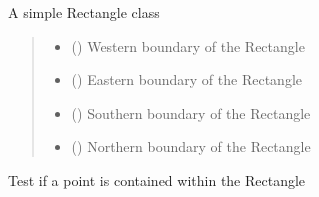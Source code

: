 \documentclass[letterpaper,10pt,english]{sphinxmanual}
\begin{document}
\begin{fulllineitems}
\label{\detokenize{users_guide:GeoSpatialTools.quadtree.Rectangle}}
\pysigstartsignatures
{}
\pysigstopsignatures
\sphinxAtStartPar
A simple Rectangle class
\begin{quote}\begin{description}
\begin{itemize}
\item {} 
\sphinxAtStartPar
{} () \textendash{} Western boundary of the Rectangle

\item {} 
\sphinxAtStartPar
{} () \textendash{} Eastern boundary of the Rectangle

\item {} 
\sphinxAtStartPar
{} () \textendash{} Southern boundary of the Rectangle

\item {} 
\sphinxAtStartPar
{} () \textendash{} Northern boundary of the Rectangle

\end{itemize}

\end{description}\end{quote}

\begin{fulllineitems}
\label{\detokenize{users_guide:GeoSpatialTools.quadtree.Rectangle.contains}}
\pysigstartsignatures
{}
\pysigstopsignatures
\sphinxAtStartPar
Test if a point is contained within the Rectangle
\begin{quote}\begin{description}
\sphinxAtStartPar
{}


\end{description}
\end{quote}
\end{fulllineitems}
\end{fulllineitems}
\end{document}
